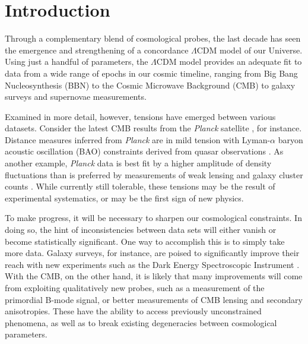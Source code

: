 \documentclass[twocolumn,aps,prd,nofootinbib,showpacs]{revtex4-1}
\begin{document}
\maketitle

\section{Introduction}
Through a complementary blend of cosmological probes, the last decade has seen the emergence and strengthening of a concordance $\Lambda$CDM model of our Universe. Using just a handful of parameters, the $\Lambda$CDM model provides an adequate fit to data from a wide range of epochs in our cosmic timeline, ranging from Big Bang Nucleosynthesis (BBN) to the Cosmic Microwave Background (CMB) to galaxy surveys and supernovae measurements.

Examined in more detail, however, tensions have emerged between various datasets. Consider the latest CMB results from the \emph{Planck} satellite \cite{Planck2015overview}, for instance. Distance measures inferred from \emph{Planck} are in mild tension with Lyman-$\alpha$ baryon acoustic oscillation (BAO) constraints derived from quasar observations \cite{Planck2015parameters}. As another example, \emph{Planck} data is best fit by a higher amplitude of density fluctuations than is preferred by measurements of weak lensing and galaxy cluster counts \cite{Planck2015clusters}. While currently still tolerable, these tensions may be the result of experimental systematics, or may be the first sign of new physics. 

To make progress, it will be necessary to sharpen our cosmological constraints. In doing so, the hint of inconsistencies between data sets will either vanish or become statistically significant. One way to accomplish this is to simply take more data. Galaxy surveys, for instance, are poised to significantly improve their reach with new experiments such as the Dark Energy Spectroscopic Instrument \cite{levi_et_al2013}. With the CMB, on the other hand, it is likely that many improvements will come from exploiting qualitatively new probes, such as a measurement of the primordial B-mode signal, or better measurements of CMB lensing and secondary anisotropies. These have the ability to access previously unconstrained phenomena, as well as to break existing degeneracies between cosmological parameters.
\end{document}
